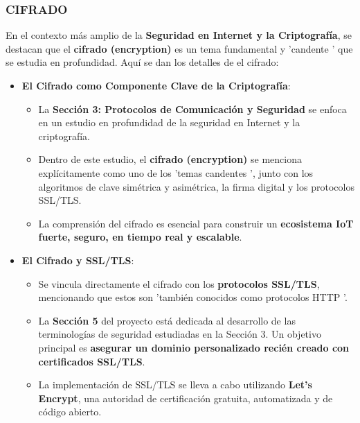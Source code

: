 \documentclass{report}
\begin{document}
\subsubsection{CIFRADO}
En el contexto más amplio de la \textbf{Seguridad en Internet y la Criptografía}, se  destacan que el \textbf{cifrado (encryption)} es un tema 
fundamental y  'candente ' que se estudia en profundidad. Aquí se dan los detalles de el cifrado:

\begin{itemize}
    \item \textbf{El Cifrado como Componente Clave de la Criptografía}:
    \begin{itemize}
        \item La \textbf{Sección 3: Protocolos de Comunicación y Seguridad} se enfoca en un estudio en profundidad de la seguridad en Internet y la 
        criptografía.
        \item Dentro de este estudio, el \textbf{cifrado (encryption)} se menciona explícitamente como uno de los  'temas candentes ', junto con los 
        algoritmos de clave simétrica y asimétrica, la firma digital y los protocolos SSL/TLS.
        \item La comprensión del cifrado es esencial para construir un \textbf{ecosistema IoT fuerte, seguro, en tiempo real y escalable}.
    \end{itemize}

    \item \textbf{El Cifrado y SSL/TLS}:
    \begin{itemize}
        \item Se vincula directamente el cifrado con los \textbf{protocolos SSL/TLS}, mencionando que estos son  'también conocidos como 
        protocolos HTTP '.
        \item La \textbf{Sección 5} del proyecto está dedicada al desarrollo de las terminologías de seguridad estudiadas en la Sección 3. Un 
        objetivo principal es \textbf{asegurar un dominio personalizado recién creado con certificados SSL/TLS}.
        \item La implementación de SSL/TLS se lleva a cabo utilizando \textbf{Let's Encrypt}, una autoridad de certificación gratuita, automatizada y 
        de código abierto.
    \end{itemize}


\end{itemize}
\end{document}
